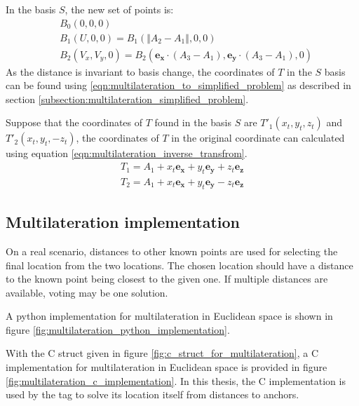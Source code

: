 \documentclass[\main/main.tex]{subfiles}
\begin{document}
In the basis $S$, the new set of points is:
\begin{equation}
    \begin{split}
        &B_0(0,0,0) \\
        &B_1(U, 0, 0) = B_1(\Vert A_2 - A_1 \Vert, 0, 0) \\
        &B_2(V_x, V_y, 0) = B_2(\boldsymbol{e_x} \cdot (A_3 - A_1), \boldsymbol{e_y} \cdot (A_3 - A_1), 0) 
    \end{split}
    \label{eqn:multilateration_to_simplified_problem}
\end{equation}
As the distance is invariant to basis change, the coordinates of $T$ in the $S$ basis can be found using \ref{eqn:multilateration_to_simplified_problem} as described in section \ref{subsection:multilateration_simplified_problem}.

Suppose that the coordinates of $T$ found in the basis $S$ are $T'_1(x_t,y_t,z_t)$ and $T'_2(x_t, y_t, -z_t)$, the coordinates of $T$ in the original coordinate can calculated using equation \ref{eqn:multilateration_inverse_transfrom}.
\begin{equation}
    \begin{split}
        T_1 = A_1 + x_t\boldsymbol{e_x} + y_t\boldsymbol{e_y} + z_t\boldsymbol{e_z} \\
        T_2 = A_1 + x_t\boldsymbol{e_x} + y_t\boldsymbol{e_y} - z_t\boldsymbol{e_z} 
    \end{split}
    \label{eqn:multilateration_inverse_transfrom}
\end{equation}

\subsection{Multilateration implementation}

On a real scenario, distances to other known points are used for selecting the final location from the two locations. The chosen location should have a distance to the known point being closest to the given one. If multiple distances are available, voting may be one solution.

A python implementation for multilateration in Euclidean space is shown in figure \ref{fig:multilateration_python_implementation}.

With the C struct given in figure \ref{fig:c_struct_for_multilateration}, a C implementation for multilateration in Euclidean space is provided in figure \ref{fig:multilateration_c_implementation}. In this thesis, the C implementation is used by the tag to solve its location itself from distances to anchors.
\end{document}
